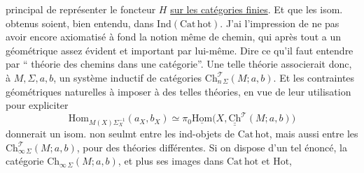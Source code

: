 principal  de représenter le foncteur $H$ \uline{sur les
catégories finies}. Et que les isom. obtenus
soient, bien entendu,  dans $\mathrm{Ind}(\mathrm{Cat}\,\mathrm{hot})$.
J'ai l'impression de ne pas avoir encore
axiomatisé à fond la notion même de
chemin, qui après tout a un  
géométrique assez évident et important par
lui-même. Dire  ce qu'il faut entendre
par `` théorie des chemins dans une catégorie''.
Une telle théorie  associerait donc, à
$M,\Sigma,a,b$, un  système inductif de
catégories $\mathrm{Ch}_{n\,\Sigma}^{\mathcal T}(M;a,b)$. Et les contraintes
géométriques naturelles à imposer à  des
telles théories, en vue  de leur utilisation
pour expliciter
\[
\mathrm{Hom}_{M(X)\Sigma_X^{-1}}(a_X,b_X)\simeq
\pi_0\underline{\mathrm{Hom}}\bigl(X,\underline{\underline{\mathrm{Ch}}}^{\mathcal T}(M;a,b)\bigr)
\]
donnerait un isom.  non seulmt
entre les ind-objets de $\mathrm{Cat}\,\mathrm{hot}$, mais  aussi
entre les $\mathrm{Ch}_{\infty\,\Sigma}^{\mathcal T}(M;a,b)$, pour des
théories différentes. Si on dispose d'un
tel énoncé, la catégorie $\mathrm{Ch}_{\infty\,\Sigma}(M;a,b)$,
et plus  ses images dans $\mathrm{Cat}\,\mathrm{hot}$ et $\mathrm{Hot}$,
